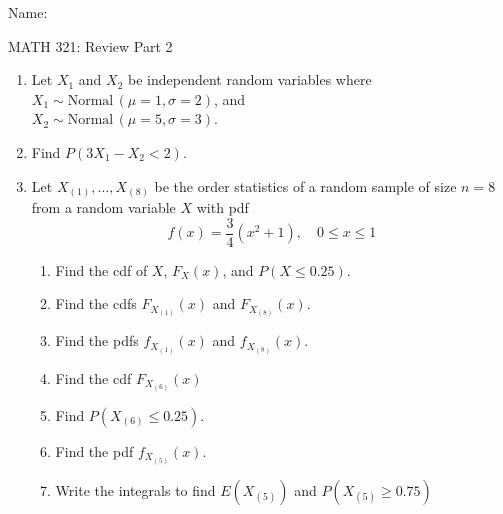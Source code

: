 \documentclass{article}
\newcommand{\follow}[1]{\sim \text{#1}\,}		%
\newcommand{\order}[2]{#1_{(#2)}}		%
\begin{document}
\hspace{375pt}Name:

\begin{center}
{\Huge MATH 321: Review Part 2}

\end{center}


\bigskip\bigskip

\begin{enumerate}
    \item Let $X_1$ and $X_2$ be independent random variables where $X_1 \follow{Normal}(\mu = 1, \sigma = 2)$, and \\ $X_2 \follow{Normal}(\mu = 5, \sigma = 3)$.
    \item[] Find $P(3X_1 - X_2 < 2)$.\vspace{70pt}

    
    \item Let $\order{X}{1}, \ldots, \order{X}{8}$ be the order statistics of a random sample of size $n = 8$ from a random variable $X$ with pdf%
    \[f(x) = \frac{3}{4} (x^2 + 1), \quad 0 \le x \le 1\]
    \begin{enumerate}
        \item Find the cdf of $X$, $F_X(x)$, and $P(X \le 0.25)$.\vspace{140pt}
        \item Find the cdfs $F_{\order{X}{1}}(x)$ and $F_{\order{X}{8}}(x)$.\vspace{140pt}
        \item Find the pdfs $f_{\order{X}{1}}(x)$ and $f_{\order{X}{8}}(x)$.\vspace{140pt}
        \item Find the cdf $F_{\order{X}{6}}(x)$\vspace{140pt}
        \item Find $P(\order{X}{6} \le 0.25)$.\vspace{140pt}
        \item Find the pdf $f_{\order{X}{5}}(x)$.\vspace{140pt}
        \item Write the integrals to find $E(\order{X}{5})$ and $P(\order{X}{5} \ge 0.75)$\vspace{140pt}
    \end{enumerate}\newpage
    

\end{enumerate}
\end{document}
